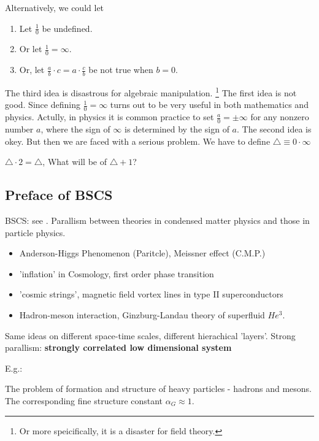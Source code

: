 \documentclass{article}
\numberwithin{equation}{subsection} %
\theoremstyle{definition}
\begin{document}
    Alternatively, we could let
    \begin{enumerate}
	    \item Let $\frac{1}{0}$ be undefined.
	    \item Or let $\frac{1}{0} =
		    \infty$.
	    \item Or, let $\frac{a}{b}\cdot c= a\cdot \frac{c}{b}$ be not 
		    true when $b=0$.
    \end{enumerate}
    The third idea is disastrous for algebraic manipulation. \footnote{
    Or more speicifically, it is a disaster for field theory.
    }
    The first idea is not good. Since defining $\frac{1}{0}=\infty$ turns
    out to be very useful in both mathematics and physics. Actully, in
    physics it is common practice to set $\frac{a}{0}=\pm\infty$ for
    any nonzero number $a$, where the sign of $\infty$ is determined by 
    the sign of $a$.
    The second idea is okey. But then we are faced with a serious problem.
    We have to define $\triangle \equiv 0 \cdot \infty$

    $\triangle \cdot 2 = \triangle$, What will be of $\triangle + 1$?

    \subsection{Preface of BSCS}
        \label{sec:Preface_of_Bosonization_and_Strongly 
        Correlated_Systems}
    BSCS: see \cite{BSCS}.
    Parallism between theories in condensed matter physics and those in
    particle physics.
    \begin{itemize}
            \item Anderson-Higgs Phenomenon (Paritcle), Meissner effect
                    (C.M.P.)
            \item 'inflation' in Cosmology, first order phase transition
            \item 'cosmic strings', magnetic field vortex lines in type
                    II superconductors
            \item Hadron-meson interaction, Ginzburg-Landau theory of
                    superfluid $He^3$.
    \end{itemize}
    Same ideas on different space-time scales, different hierachical
    'layers'.
    Strong parallism: \textbf{strongly correlated low dimensional system}

    E.g.:

    The problem of formation and structure of heavy particles - hadrons and mesons. The corresponding fine structure constant $\alpha_G\approx 1$.
\end{document}

